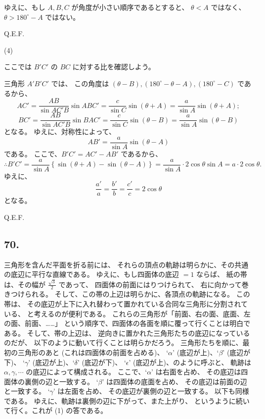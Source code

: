 ゆえに、もし $A, B, C$ が角度が小さい順序であるとすると、
$\theta < A$ ではなく、$\theta > 180^\circ - A$ ではない。

Q.E.F.

(4)

ここでは $B'C'$ の $BC$ に対する比を確認しよう。

三角形 $A'B'C'$ では、
この角度は $(\theta - B), (180^\circ - \theta - A), (180^\circ - C)$
であるから、
\[
AC' = \frac{AB}{\sin AC'B} \sin ABC'
= \frac{c}{\sin C} \sin (\theta + A) 
= \frac{a}{\sin A} \sin (\theta + A);
\]
\[
BC' = \frac{AB}{\sin AC'B} \sin BAC'
= \frac{c}{\sin C} \sin (\theta - B) 
= \frac{a}{\sin A} \sin (\theta - B) 
\]
となる。
ゆえに、対称性によって、
\[
AB' = \frac{a}{\sin A} \sin (\theta - A) 
\]
である。
ここで、$B'C' = AC' - AB'$ であるから、
\[
\therefore
B'C' = \frac{a}{\sin A} \left\{
    \sin (\theta + A) - \sin (\theta - A) \right\}
    = \frac{a}{\sin A} \cdot 2 \cos \theta \sin A
    = a \cdot 2\cos \theta.
\]
ゆえに、
\[
\frac{a'}{a} = \frac{b'}{b} = \frac{c'}{c} = 2 \cos \theta
\]
となる。

Q.E.F.


\subsection*{70.}

三角形を含んだ平面を折る前には、
それらの頂点の軌跡は明らかに、その共通の底辺に平行な直線である。
ゆえに、もし四面体の底辺 $=1$ ならば、
紙の帯は、その幅が $\frac{\sqrt{3}}{2}$ であって、
四面体の前面にはりつけられて、
右に向かって巻きつけられる。
そして、この帯の上辺は明らかに、各頂点の軌跡になる。
この帯は、
その底辺が上下に入れ替わって置かれている合同な三角形に分割されている、
と考えるのが便利である。
これらの三角形が「前面、右の面、底面、左の面、前面、……」
という順序で、四面体の各面を順に覆って行くことは明白である。
そして、帯の上辺は、
逆向きに置かれた三角形たちの底辺になっているのだが、
以下のように動いて行くことは明らかだろう。
三角形たちを順に、最初の三角形のあと
(これは四面体の前面を占める)、
`$\alpha$' (底辺が上)、`$\beta$' (底辺が下)、
`$\gamma$' (底辺が上)、`$\delta$' (底辺が下)、
`$\epsilon$' (底辺が上)、のように呼ぶと、
軌跡は $\alpha, \gamma, \cdots$ の底辺によって構成される。
ここで、`$\alpha$' は右面を占め、
その底辺は四面体の裏側の辺と一致する。
`$\beta$' は四面体の底面を占め、
その底辺は前面の辺と一致する。
`$\gamma$' は左面を占め、
その底辺が裏側の辺と一致する。
以下も同様である。
ゆえに、軌跡は裏側の辺に下がって、また上がり、
というように続いて行く。これが (1) の答である。

